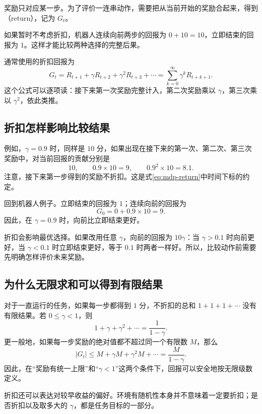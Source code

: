 \documentclass[UTF8]{ctexart}
\begin{document}
奖励只对应某一步。为了评价一连串动作，需要把从当前开始的奖励合起来，得到（return），记为 $G_t$。

如果暂时不考虑折扣，机器人连续向前两步的回报为 $0+10=10$，立即结束的回报为 $1$。这样才能比较两种选择的完整后果。

通常使用的折扣回报为
\begin{equation}
  G_t=R_{t+1}+\gamma R_{t+2}+\gamma^2R_{t+3}+\cdots
     =\sum_{k=0}^{\infty}\gamma^kR_{t+k+1}.
  \label{eq:mdp-return}
\end{equation}
这个公式可以逐项读：接下来第一次奖励完整计入，第二次奖励乘以 $\gamma$，第三次乘以 $\gamma^2$，依此类推。

\subsection{折扣怎样影响比较结果}

例如，$\gamma=0.9$ 时，同样是 $10$ 分，如果出现在接下来的第一次、第二次、第三次奖励中，对当前回报的贡献分别是
\[
  10,\qquad 0.9\times10=9,\qquad 0.9^2\times10=8.1.
\]
注意，接下来第一步得到的奖励不折扣。这是式\eqref{eq:mdp-return}中时间下标的约定。

回到机器人例子。立即结束的回报为 $1$；连续向前的回报为
\begin{equation}
  G_0=0+0.9\times10=9.
  \label{eq:mdp-example-return}
\end{equation}
因此，在 $\gamma=0.9$ 时，向前比立即结束更好。

折扣会影响最优选择。如果改用任意 $\gamma$，向前的回报为 $10\gamma$：当 $\gamma>0.1$ 时向前更好，当 $\gamma<0.1$ 时立即结束更好，等于 $0.1$ 时两者一样好。所以，比较动作前需要先明确怎样评价未来奖励。

\subsection{为什么无限求和可以得到有限结果}

对于一直运行的任务，如果每一步都得到 $1$ 分，不折扣的总和 $1+1+1+\cdots$ 没有有限结果。若 $0\leq\gamma<1$，则
\[
  1+\gamma+\gamma^2+\cdots=\frac{1}{1-\gamma}.
\]
更一般地，如果每一步奖励的绝对值都不超过同一个有限数 $M$，那么
\begin{equation}
  |G_t|\leq M+\gamma M+\gamma^2M+\cdots
           =\frac{M}{1-\gamma}.
  \label{eq:mdp-return-bound}
\end{equation}
因此，在“奖励有统一上限”和“$\gamma<1$”这两个条件下，回报可以安全地按无限级数定义。

折扣还可以表达对较早收益的偏好。环境有随机性本身并不意味着一定要折扣；是否折扣以及取多大的 $\gamma$，都是任务目标的一部分。
\end{document}
